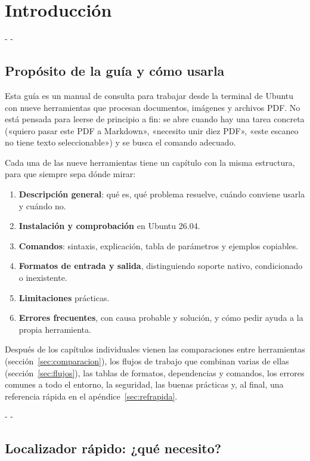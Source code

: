 \documentclass[11pt,a4paper]{article}
\makeatletter
\newcommand{\necesitaespacio}[1]{\par\penalty-100\begingroup
	\setlength{\dimen@}{#1}\dimen@ii\pagegoal\advance\dimen@ii-\pagetotal
	\ifdim\dimen@>\dimen@ii\ifdim\dimen@ii>\z@\vfil\fi\penalty-\@M\fi\endgroup}
\makeatother
\begin{document}
	\section{Introducción}\label{sec:intro}
	
	\necesitaespacio{8\baselineskip}
	\subsection{Propósito de la guía y cómo usarla}
	
	Esta guía es un manual de consulta para trabajar desde la terminal de Ubuntu con nueve herramientas que procesan documentos, imágenes y archivos PDF. No está pensada para leerse de principio a fin: se abre cuando hay una tarea concreta («quiero pasar este PDF a Markdown», «necesito unir diez PDF», «este escaneo no tiene texto seleccionable») y se busca el comando adecuado.
	
	Cada una de las nueve herramientas tiene un capítulo con la misma estructura, para que siempre sepa dónde mirar:
	
	\begin{enumerate}[label=\arabic*.]
		\item \textbf{Descripción general}: qué es, qué problema resuelve, cuándo conviene usarla y cuándo no.
		\item \textbf{Instalación y comprobación} en Ubuntu 26.04.
		\item \textbf{Comandos}: sintaxis, explicación, tabla de parámetros y ejemplos copiables.
		\item \textbf{Formatos de entrada y salida}, distinguiendo soporte nativo, condicionado o inexistente.
		\item \textbf{Limitaciones} prácticas.
		\item \textbf{Errores frecuentes}, con causa probable y solución, y cómo pedir ayuda a la propia herramienta.
	\end{enumerate}
	
	Después de los capítulos individuales vienen las comparaciones entre herramientas (sección~\ref{sec:comparacion}), los flujos de trabajo que combinan varias de ellas (sección~\ref{sec:flujos}), las tablas de formatos, dependencias y comandos, los errores comunes a todo el entorno, la seguridad, las buenas prácticas y, al final, una referencia rápida en el apéndice~\ref{sec:refrapida}.
	
	\necesitaespacio{14\baselineskip}
	\subsection{Localizador rápido: ¿qué necesito?}\label{sec:localizador}
	
\end{document}
